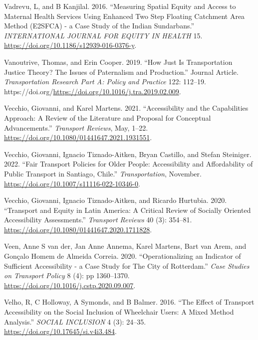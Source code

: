 \documentclass[12pt, oneside]{report}
\newlength{\cslhangindent}
\newlength{\cslentryspacingunit} %
\newenvironment{CSLReferences}[2] %
 {%
  \setlength{\parindent}{0pt}
  \ifodd #1
  \let\oldpar\par
  \def\par{\hangindent=\cslhangindent\oldpar}
  \fi
  \setlength{\parskip}{#2\cslentryspacingunit}
 }%
 {}
\begin{document}
\begin{CSLReferences}{1}{0}
\leavevmode{}%
Vadrevu, L, and B Kanjilal. 2016. {``Measuring Spatial Equity and Access
to Maternal Health Services Using Enhanced Two Step Floating Catchment
Area Method ({E2SFCA}) - a Case Study of the {Indian Sundarbans}.''}
\emph{INTERNATIONAL JOURNAL FOR EQUITY IN HEALTH} 15.
\url{https://doi.org/10.1186/s12939-016-0376-y}.

\leavevmode{}%
Vanoutrive, Thomas, and Erin Cooper. 2019. {``How Just Is Transportation
Justice Theory? The Issues of Paternalism and Production.''} Journal
Article. \emph{Transportation Research Part A: Policy and Practice} 122:
112--19.
https://doi.org/\url{https://doi.org/10.1016/j.tra.2019.02.009}.

\leavevmode{}%
Vecchio, Giovanni, and Karel Martens. 2021. {``Accessibility and the
{Capabilities Approach}: A Review of the Literature and Proposal for
Conceptual Advancements.''} \emph{Transport Reviews}, May, 1--22.
\url{https://doi.org/10.1080/01441647.2021.1931551}.

\leavevmode{}%
Vecchio, Giovanni, Ignacio Tiznado-Aitken, Bryan Castillo, and Stefan
Steiniger. 2022. {``Fair Transport Policies for Older People:
Accessibility and Affordability of Public Transport in {Santiago},
{Chile}.''} \emph{Transportation}, November.
\url{https://doi.org/10.1007/s11116-022-10346-0}.

\leavevmode{}%
Vecchio, Giovanni, Ignacio Tiznado-Aitken, and Ricardo Hurtubia. 2020.
{``Transport and Equity in {Latin America}: A Critical Review of
Socially Oriented Accessibility Assessments.''} \emph{Transport Reviews}
40 (3): 354--81. \url{https://doi.org/10.1080/01441647.2020.1711828}.

\leavevmode{}%
Veen, Anne S van der, Jan Anne Annema, Karel Martens, Bart van Arem, and
Gonçalo Homem de Almeida Correia. 2020. {``Operationalizing an
{Indicator} of {Sufficient Accessibility} - a {Case Study} for {The
City} of {Rotterdam}.''} \emph{Case Studies on Transport Policy} 8 (4):
pp 1360--1370. \url{https://doi.org/10.1016/j.cstp.2020.09.007}.

\leavevmode{}%
Velho, R, C Holloway, A Symonds, and B Balmer. 2016. {``The {Effect} of
{Transport Accessibility} on the {Social Inclusion} of {Wheelchair
Users}: {A Mixed Method Analysis}.''} \emph{SOCIAL INCLUSION} 4 (3):
24--35. \url{https://doi.org/10.17645/si.v4i3.484}.


\end{CSLReferences}
\end{document}
